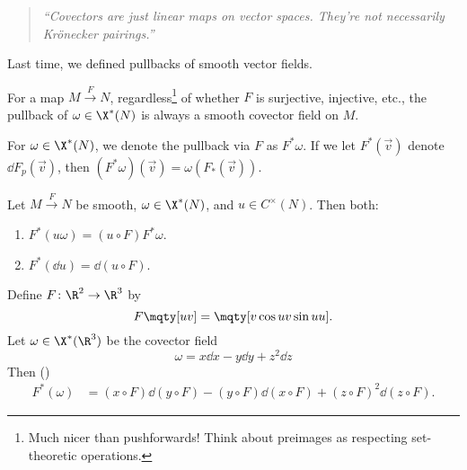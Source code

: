 \begin{quote}\textit{
    ``Covectors are just linear maps on vector spaces. They're not necessarily Krönecker pairings.''
}\end{quote}

Last time, we defined  pullbacks of smooth vector fields.

\begin{note}[]
   For a map $M \xrightarrow{F} N$, regardless\footnote{Much nicer than pushforwards! Think about preimages as respecting set-theoretic operations.} of whether $F$ is surjective, injective, etc., the pullback of $\omega \in \X^*(N)$ is always a smooth covector field on $M$.
\end{note}

For $\omega \in \X^*(N)$, we denote the pullback via $F$ as $F^* \omega$. If we let $F^*(\vec v)$ denote $\dd{F_p} (\vec v)$, then $(F^* \omega)(\vec v) = \omega (F_*(\vec v))$.

\begin{prop}[]
    Let $M \xrightarrow{F} N$ be smooth, $\omega \in \X^*(N)$, and $u \in C^\times(N)$. Then both:
    \begin{enumerate}
        \item $F^*(u\omega) = (u \circ F)F^* \omega$.
        \item $F^*(\dd{u}) = \dd{ (u\circ F) }$.
    \end{enumerate}
\end{prop}

\begin{ex}[Helicoids]
    Define $F \colon \R^2 \to \R^3$ by 
    \begin{equation*}
        F\mqty[u\\ v] = \mqty[v\cos u\\ v\sin u\\ u].
    \end{equation*}
    Let $\omega \in  \X^*(\R^3)$ be the covector field
    \begin{equation*}
        \omega = x \dd{x} - y \dd{y} + z^2 \dd{z} 
    \end{equation*}
    Then (\TODO)
    \begin{align*}
        F^*(\omega) &= (x \circ F)\dd{(y \circ F)} - (y \circ F)\dd{(x \circ F)} + (z \circ F)^2 \dd{(z \circ F)}.
    \end{align*}
\end{ex}


